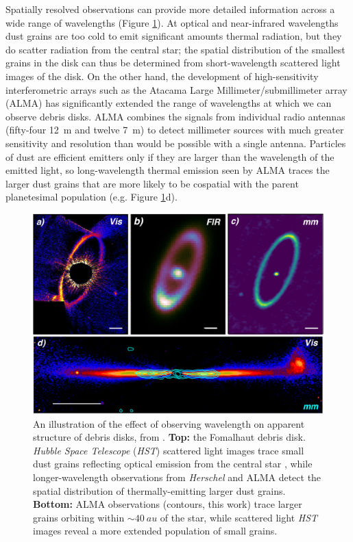\documentclass[12pt,oneside]{book}
\begin{document}
Spatially resolved observations can provide more detailed information across a wide range of wavelengths (Figure \ref{fig: observation comparison}).
At optical and near-infrared wavelengths dust grains are too cold to emit significant amounts thermal radiation, but they do scatter radiation from the central star; the spatial distribution of the smallest grains in the disk can thus be determined from short-wavelength scattered light images of the disk.
On the other hand, the development of high-sensitivity interferometric arrays such as the Atacama Large Millimeter/submillimeter array (ALMA) has significantly extended the range of wavelengths at which we can observe debris disks.
ALMA combines the signals from individual radio antennas (fifty-four \SI{12}{m} and twelve \SI{7}{m}) to detect millimeter sources with much greater sensitivity and resolution than would be possible with a single antenna.
Particles of dust are efficient emitters only if they are larger than the wavelength of the emitted light, so long-wavelength thermal emission seen by ALMA traces the larger dust grains that are more likely to be cospatial with the parent planetesimal population (e.g. Figure \ref{fig: observation comparison}d).

\begin{figure}
  \includegraphics[width=\linewidth]{../figures/hughes_etal18_observation_comparison}
  \caption{
  An illustration of the effect of observing wavelength on apparent structure of debris disks, from \cite{hughes18}. 
  \textbf{Top:} the Fomalhaut debris disk.
  \textit{Hubble Space Telescope} (\textit{HST}) scattered light images trace small dust grains reflecting optical emission from the central star \citep[\textbf{a},][]{kalas13}, while longer-wavelength observations from \textit{Herschel} \citep[\textbf{b},][]{acke12} and ALMA \citep[\textbf{c},][]{macgregor17} detect the spatial distribution of thermally-emitting larger dust grains.
  \textbf{Bottom:} ALMA observations (contours, this work) trace larger grains orbiting within $\sim \SI{40}{au}$ of the star, while scattered light \textit{HST} images \citep[colormap,][]{schneider14} reveal a more extended population of small grains.
  }
  \label{fig: observation comparison}
\end{figure}
\end{document}
